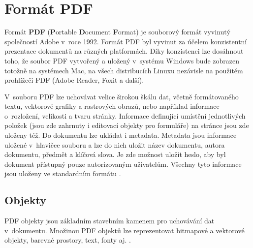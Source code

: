 \chapter{Formát PDF}
Formát \textbf{PDF} (\textbf{P}ortable \textbf{D}ocument \textbf{F}ormat) je souborový formát vyvinutý společností Adobe v~roce 1992. Formát PDF byl vyvinut za účelem konzistentní prezentace dokumentů na různých platformách. Díky konzistenci lze dosáhnout toho, že soubor PDF vytvořený a uložený v~systému Windows bude zobrazen totožně na systémech Mac, na všech distribucích Linuxu nezávisle na použitém prohlížeči PDF (Adobe Reader, Foxit a další).
\par 
V~souboru PDF lze uchovávat velice širokou škálu dat, včetně formátovaného textu, vektorové grafiky a rastrových obrazů, nebo například informace o~rozložení, velikosti a tvaru stránky. Informace definující umístění jednotlivých položek (jsou zde zahrnuty i editovací objekty pro formuláře) na stránce jsou zde uloženy též. Do dokumentu lze ukládat i metadata. Metadata jsou informace uložené v~hlavičce souboru a lze do nich uložit název dokumentu, autora dokumentu, předmět a klíčová slova. Je zde možnost uložit heslo, aby byl dokument přístupný pouze autorizovaným uživatelům. Všechny tyto informace jsou uloženy ve standardním formátu \cite{PDFTechTerms, PDFWhatIs}.

\section{Objekty}
PDF objekty jsou základním stavebním kamenem pro uchovávání dat v~dokumentu. Množinou PDF objektů lze reprezentovat bitmapové a vektorové objekty, barevné prostory, text, fonty aj. \cite{PDFExplained}.
